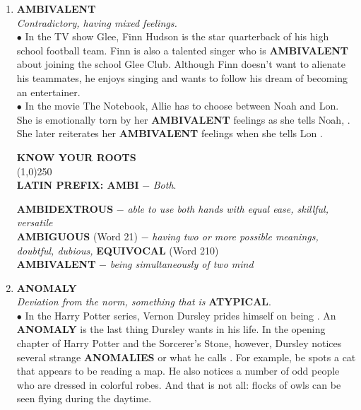 \documentclass{book}
\begin{document}
\begin{enumerate}
\item  \textbf{AMBIVALENT}\\
\textit{Contradictory, having mixed feelings.}\\

$\bullet$ In the TV show Glee, Finn Hudson is the star
quarterback of his high school football team. Finn is
also a talented singer who is \textbf{AMBIVALENT} about
joining the school Glee Club. Although Finn doesn't
want to alienate his teammates, he enjoys singing and
wants to follow his dream of becoming an entertainer.\\

$\bullet$ In the movie The Notebook, Allie has to choose
between Noah and Lon. She is emotionally torn by her
\textbf{AMBIVALENT} feelings as she tells Noah, .
She later reiterates her \textbf{AMBIVALENT} feelings when
she tells Lon .

\begin{tcolorbox}
\begin{center}
\textbf{ KNOW YOUR ROOTS}\\
\line(1,0){250}\\
\textbf{LATIN PREFIX: AMBI }$ - $ \textit{Both}.\\  
\end{center}  
\textbf{AMBIDEXTROUS} $ - $ \textit{able to use both hands with equal ease, skillful, versatile}\\
\textbf{AMBIGUOUS} (Word 21) $ - $ \textit{having two or more possible meanings, doubtful, dubious,} \textbf{ EQUIVOCAL} (Word 210)\\
\textbf{AMBIVALENT} $ - $ \textit{ being simultaneously of two mind}
\end{tcolorbox}

\item  \textbf{ANOMALY}\\ \textit{Deviation from the norm, something that is}
\textbf{ATYPICAL}.\\

$\bullet$ In the Harry Potter series, Vernon Dursley prides
himself on being . An \textbf{ANOMALY} is the last thing Dursley wants
in his life. In the opening chapter of Harry Potter and
the Sorcerer's Stone, however, Dursley notices several
strange \textbf{ANOMALIES} or what he calls .
For example, be spots a cat that appears to be reading
a map. He also notices a number of odd people who
are dressed in colorful robes. And that is not all: flocks
of owls can be seen flying during the daytime.


\end{enumerate}
\end{document}
